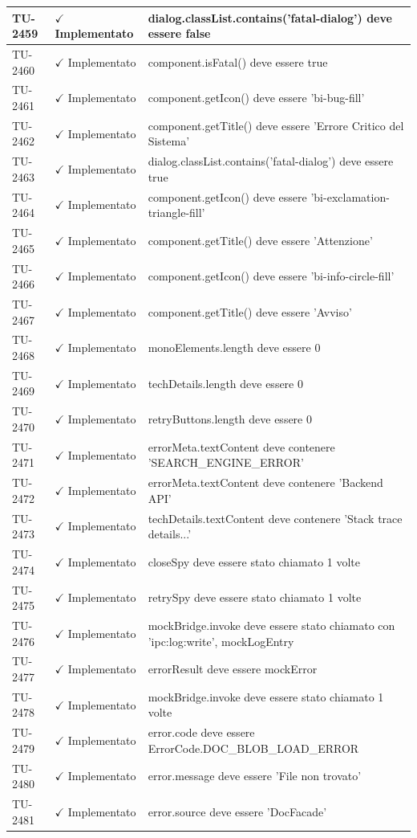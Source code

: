 ﻿\documentclass[a4paper,12pt]{article}
\newcommand{\ok}{\textcolor{green!60!black}{$\checkmark$ Implementato}}
\begin{document}
\begin{longtable}{|p{2cm}|p{3.5cm}|p{9.5cm}|}
\hline
TU-2459 & \ok & dialog.classList.contains('fatal-dialog') deve essere false \\
\hline
TU-2460 & \ok & component.isFatal() deve essere true \\
\hline
TU-2461 & \ok & component.getIcon() deve essere 'bi-bug-fill' \\
\hline
TU-2462 & \ok & component.getTitle() deve essere 'Errore Critico del Sistema' \\
\hline
TU-2463 & \ok & dialog.classList.contains('fatal-dialog') deve essere true \\
\hline
TU-2464 & \ok & component.getIcon() deve essere 'bi-exclamation-triangle-fill' \\
\hline
TU-2465 & \ok & component.getTitle() deve essere 'Attenzione' \\
\hline
TU-2466 & \ok & component.getIcon() deve essere 'bi-info-circle-fill' \\
\hline
TU-2467 & \ok & component.getTitle() deve essere 'Avviso' \\
\hline
TU-2468 & \ok & monoElements.length deve essere 0 \\
\hline
TU-2469 & \ok & techDetails.length deve essere 0 \\
\hline
TU-2470 & \ok & retryButtons.length deve essere 0 \\
\hline
TU-2471 & \ok & errorMeta.textContent deve contenere 'SEARCH\_ENGINE\_ERROR' \\
\hline
TU-2472 & \ok & errorMeta.textContent deve contenere 'Backend API' \\
\hline
TU-2473 & \ok & techDetails.textContent deve contenere 'Stack trace details...' \\
\hline
TU-2474 & \ok & closeSpy deve essere stato chiamato 1 volte \\
\hline
TU-2475 & \ok & retrySpy deve essere stato chiamato 1 volte \\
\hline
TU-2476 & \ok & mockBridge.invoke deve essere stato chiamato con 'ipc:log:write', mockLogEntry \\
\hline
TU-2477 & \ok & errorResult deve essere mockError \\
\hline
TU-2478 & \ok & mockBridge.invoke deve essere stato chiamato 1 volte \\
\hline
TU-2479 & \ok & error.code deve essere ErrorCode.DOC\_BLOB\_LOAD\_ERROR \\
\hline
TU-2480 & \ok & error.message deve essere 'File non trovato' \\
\hline
TU-2481 & \ok & error.source deve essere 'DocFacade' \\

\end{longtable}
\end{document}

